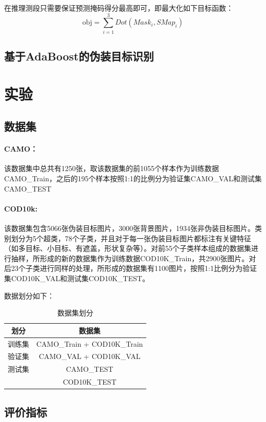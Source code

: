 \documentclass[a4paper,12pt]{ctexart}
\begin{document}
在推理测段只需要保证预测掩码得分最高即可，即最大化如下目标函数：
$$
\text{obj} = \sum_{i=1}^3 Dot(Mask_{i},SMap_{i})
$$

\subsection{基于AdaBoost的伪装目标识别}

\section{实验}

\subsection{数据集}
\paragraph{CAMO\cite{Le2019AnabranchNF}：}该数据集中总共有1250张，取该数据集的前1055个样本作为训练数据CAMO\_Train，之后的195个样本按照1:1的比例分为验证集CAMO\_VAL和测试集CAMO\_TEST

\paragraph{COD10k\cite{Fan2020CamouflagedOD}: }该数据集包含5066张伪装目标图片，3000张背景图片，1934张非伪装目标图片。类别划分为5个超类，78个子类，并且对于每一张伪装目标图片都标注有关键特征（如多目标、小目标、有遮盖，形状复杂等）。对前55个子类样本组成的数据集进行抽样，所形成的新的数据集作为训练数据COD10K\_Train，共2900张图片。对后23个子类进行同样的处理，所形成的数据集有1100图片，按照1:1比例分为验证集COD10K\_VAL和测试集COD10K\_TEST。

数据划分如下：
\begin{table}[ht]
    \centering
    \begin{tabular}{|c|c|}
    \hline
    \textbf{划分} & \textbf{数据集} \\
    \hline
    训练集 & CAMO\_Train + COD10K\_Train \\
    \hline
    验证集 & CAMO\_VAL + COD10K\_VAL \\
    \hline
    测试集 & CAMO\_TEST \\
          & COD10K\_TEST \\
    \hline
    \end{tabular}
    \caption{数据集划分}
\end{table}
\subsection{评价指标}
\end{document}
